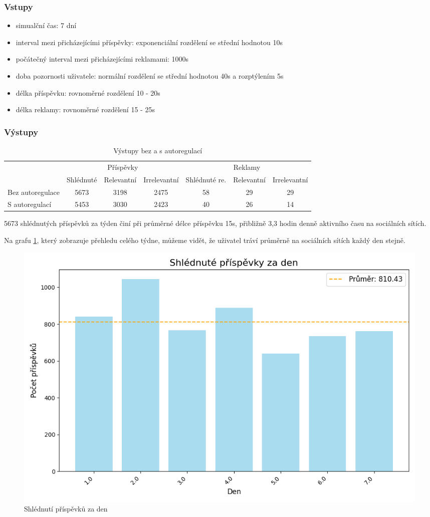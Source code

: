 \documentclass[11pt, a4paper]{article}
\begin{document}
\subsubsection{Vstupy}
\begin{itemize}
    \item simualční čas: 7 dní
    \item interval mezi přicházejícími příspěvky: exponenciální rozdělení se střední hodnotou 10s
    \item počátečný interval mezi přicházejícími reklamami: 1000s
    \item doba pozornosti uživatele: normální rozdělení se střední hodnotou 40s a rozptýlením 5s
    \item délka příspěvku: rovnoměrné rozdělení 10 - 20s
    \item délka reklamy: rovnoměrné rozdělení 15 - 25s
\end{itemize}

\subsubsection{Výstupy}

\begin{table}[h]
    \centering
    \begin{tabular}{|l|c|c|c|c|c|c|}
        \hline
        & \multicolumn{3}{c|}{Příspěvky} & \multicolumn{3}{c|}{Reklamy} \\ 
        & Shlédnuté & Relevantní & Irrelevantní & Shlédnuté re. & Relevantní & Irrelevantní \\
        \hline
        Bez autoregulace & 5673 & 3198 & 2475 & 58 & 29 & 29 \\
        S autoregulací & 5453 & 3030 & 2423 & 40 & 26 & 14 \\
        \hline
    \end{tabular}
    \caption{Výstupy bez a s autoregulací}
    \label{tab:autoregulace}
\end{table}

5673 shlédnutých příspěvků za týden činí při průměrné délce příspěvku 15s, přibližně 3,3 hodin denně aktivního času na sociálních sítích.

Na grafu \ref{fig:Shlédnuté_příspěvky_za_den}, který zobrazuje přehledu celého týdne, můžeme vidět, že uživatel tráví průměrně na sociálních sítích každý den stejně.
\begin{figure}[h]
    \centering
    \includegraphics[width=0.5\linewidth]{Shlédnuté_příspěvky_za_den.png}
    \caption{Shlédnutí příspěvků za den}
    \label{fig:Shlédnuté_příspěvky_za_den}
\end{figure}
\end{document}
